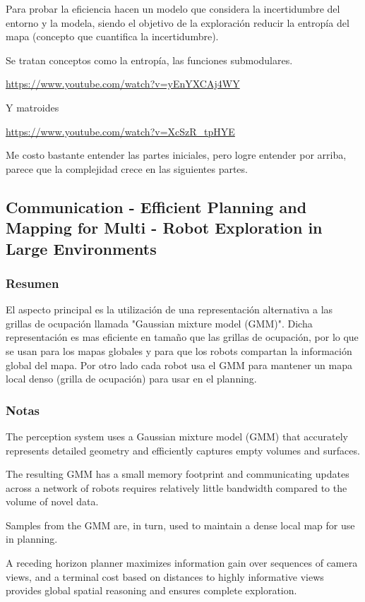 Para probar la eficiencia hacen un modelo que considera la incertidumbre del entorno y la modela, siendo el objetivo de la exploración reducir la entropía del mapa (concepto que cuantifica la incertidumbre).

Se tratan conceptos como la entropía, las funciones submodulares.

\url{https://www.youtube.com/watch?v=yEnYXCAj4WY}

Y matroides

\url{https://www.youtube.com/watch?v=XcSzR_tpHYE}

Me costo bastante entender las partes iniciales, pero logre entender por arriba, parece que la complejidad crece en las siguientes partes.

\subsection{Communication - Efficient Planning and Mapping for Multi - Robot Exploration in Large Environments}
\subsubsection{Resumen}
El aspecto principal es la utilización de una representación alternativa a las grillas de ocupación llamada "Gaussian mixture model (GMM)". Dicha representación es mas eficiente en tamaño que las grillas de ocupación, por lo que se usan para los mapas globales y para que los robots compartan la información global del mapa. Por otro lado cada robot usa el GMM para mantener un mapa local denso (grilla de ocupación) para usar en el planning. 

\subsubsection{Notas}

The perception system uses a Gaussian mixture model (GMM) that accurately represents detailed geometry and efficiently captures empty volumes and surfaces. 

The resulting GMM has a small memory footprint and communicating updates across a network of robots requires relatively little bandwidth compared to the volume of novel data.

Samples from the GMM are, in turn, used to maintain a dense local map for use in planning.

A receding horizon planner maximizes information gain over sequences of camera views, and a terminal cost based on distances to highly informative views provides global spatial reasoning and ensures complete exploration.

